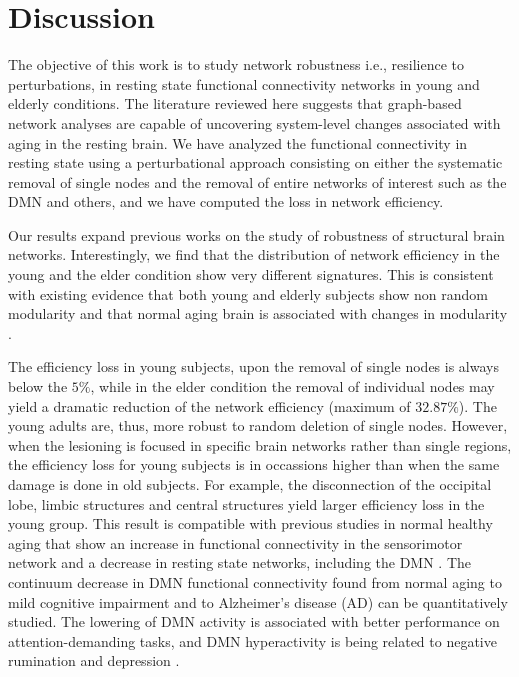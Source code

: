 \documentclass[12pt,a4paper]{article}
\begin{document}
\section{Discussion}
\label{discussion}

The objective of this work is to study network robustness i.e., resilience to
perturbations, in resting state functional connectivity networks in young and elderly conditions.
The literature reviewed here suggests that graph-based network
analyses are capable of uncovering system-level changes associated with
aging in the resting brain. 
We have analyzed the functional connectivity in resting state using a perturbational approach consisting on either the systematic removal of single nodes and the removal of entire networks of interest such as the DMN and others, and we have computed the loss in network efficiency.

Our results expand previous works on the study of robustness of
structural brain networks. %
Interestingly, we find that the distribution of network efficiency in the young and the elder condition show very different signatures. This is consistent with existing evidence \citep{meunier_age-related_2009} that both young and elderly subjects show non random modularity and that normal aging brain is associated with changes in modularity \citep{song_age-related_2014}.

The efficiency loss in young subjects, upon the removal of single nodes is always below the $5\%$, while in the elder condition the removal of individual nodes may yield a dramatic reduction of the network efficiency (maximum of $32.87\%$).
The young adults are, thus, more robust to random deletion of single nodes. However, when the lesioning is focused in specific brain networks rather than single regions, the efficiency loss for young subjects is in occassions higher than when the same damage is done in old subjects. For example, the disconnection of the occipital lobe, limbic structures and central structures yield larger efficiency loss in the young group. This result is compatible with previous studies in normal healthy aging that show an increase in functional connectivity in the sensorimotor network and a decrease in resting state networks, including the DMN \citep{song_age-related_2014}.
The continuum decrease in DMN functional connectivity found from normal aging to mild cognitive impairment and to Alzheimer's disease (AD) can be quantitatively studied. The lowering of DMN activity is associated with better performance on attention-demanding tasks, and DMN hyperactivity is being related to negative rumination and depression \citep{whitfield-gabrieli_default_2012}.    
\end{document}

